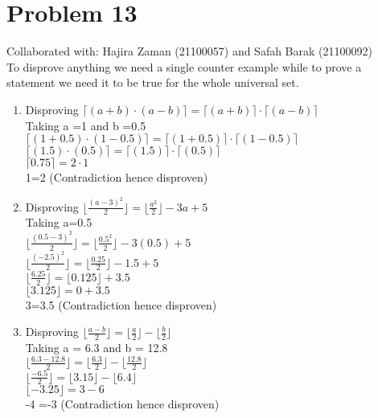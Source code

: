 \documentclass{article}
\begin{document}
\section{Problem 13}
Collaborated with: Hajira Zaman (21100057) and Safah Barak (21100092) \\
To disprove anything we need a single counter example while to prove a statement we need it to be true for the whole universal set.
\begin{enumerate}
\item %
Disproving $\lceil (a+b)\cdot(a-b)\rceil = \lceil (a+b)\rceil\cdot\lceil(a-b)\rceil$ \\
Taking a =1 and b =0.5 \\
$\lceil (1+0.5)\cdot(1-0.5)\rceil = \lceil (1+0.5)\rceil\cdot\lceil(1-0.5)\rceil$ \\
$\lceil (1.5)\cdot(0.5)\rceil = \lceil (1.5)\rceil\cdot\lceil(0.5)\rceil$ \\
$\lceil0.75\rceil = 2\cdot1$ \\
1=2 (Contradiction hence disproven)
\item %
Disproving $\lfloor \frac{\left(a-3\right)^2}{2}\rfloor = \lfloor\frac{a^2}{2}\rfloor - 3a + 5$ \\
Taking a=0.5 \\
$\lfloor \frac{\left(0.5-3\right)^2}{2}\rfloor = \lfloor\frac{0.5^2}{2}\rfloor - 3(0.5) + 5$ \\
$\lfloor \frac{\left(-2.5\right)^2}{2}\rfloor = \lfloor\frac{0.25}{2}\rfloor - 1.5 + 5$\\
$\lfloor \frac{6.25}{2}\rfloor = \lfloor0.125\rfloor + 3.5$\\
$\lfloor 3.125\rfloor = 0 + 3.5$\\
3=3.5 (Contradiction hence disproven) \\

\item %
Disproving $\lfloor\frac{a-b}{2}\rfloor = \lfloor\frac{a}{2}\rfloor - \lfloor\frac{b}{2}\rfloor$ \\
Taking a = 6.3 and b = 12.8 \\
$\lfloor\frac{6.3-12.8}{2}\rfloor = \lfloor\frac{6.3}{2}\rfloor - \lfloor\frac{12.8}{2}\rfloor$ \\
$\lfloor\frac{-6.5}{2}\rfloor = \lfloor3.15\rfloor - \lfloor6.4\rfloor$ \\
$\lfloor -3.25\rfloor = 3 - 6$ \\
-4 =-3 (Contradiction hence disproven)

\end{enumerate}
\end{document}
